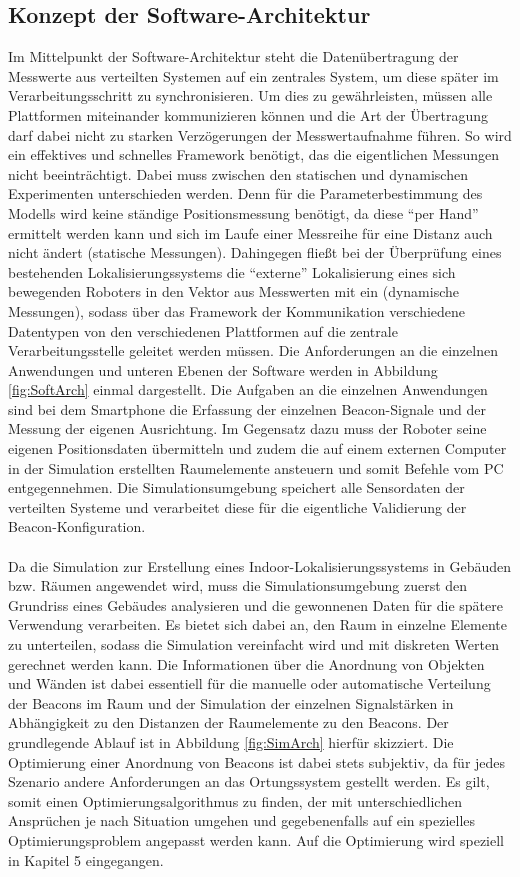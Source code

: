 \subsection{Konzept der Software-Architektur}\label{sec:KonSofArch}
Im Mittelpunkt der Software-Architektur steht die Datenübertragung der Messwerte aus verteilten Systemen auf ein zentrales System, um diese später im Verarbeitungsschritt zu synchronisieren. Um dies zu gewährleisten, müssen alle Plattformen miteinander kommunizieren können und die Art der Übertragung darf dabei nicht zu starken Verzögerungen der Messwertaufnahme führen. So wird ein effektives und schnelles Framework benötigt, das die eigentlichen Messungen nicht beeinträchtigt. Dabei muss zwischen den statischen und dynamischen Experimenten unterschieden werden. Denn für die Parameterbestimmung des Modells wird keine ständige Positionsmessung benötigt, da diese "`per Hand"' ermittelt werden kann und sich im Laufe einer Messreihe für eine Distanz auch nicht ändert (statische Messungen). Dahingegen fließt bei der Überprüfung eines bestehenden Lokalisierungssystems die "`externe"' Lokalisierung eines sich bewegenden Roboters in den Vektor aus Messwerten mit ein (dynamische Messungen), sodass über das Framework der Kommunikation verschiedene Datentypen von den verschiedenen Plattformen auf die zentrale Verarbeitungsstelle geleitet werden müssen. Die Anforderungen an die einzelnen Anwendungen und unteren Ebenen der Software werden in Abbildung \ref{fig:SoftArch} einmal dargestellt. Die Aufgaben an die einzelnen Anwendungen sind bei dem Smartphone die Erfassung der einzelnen Beacon-Signale und der Messung der eigenen Ausrichtung. Im Gegensatz dazu muss der Roboter seine eigenen Positionsdaten übermitteln und zudem die auf einem externen Computer in der Simulation erstellten Raumelemente ansteuern und somit Befehle vom PC entgegennehmen. Die Simulationsumgebung speichert alle Sensordaten der verteilten Systeme und verarbeitet diese für die eigentliche Validierung der Beacon-Konfiguration. \\ \\
Da die Simulation zur Erstellung eines Indoor-Lokalisierungssystems in Gebäuden bzw. Räumen angewendet wird, muss die Simulationsumgebung zuerst den Grundriss eines Gebäudes analysieren und die gewonnenen Daten für die spätere Verwendung verarbeiten. Es bietet sich dabei an, den Raum in einzelne Elemente zu unterteilen, sodass die Simulation vereinfacht wird und mit diskreten Werten gerechnet werden kann. Die Informationen über die Anordnung von Objekten und Wänden ist dabei essentiell für die manuelle oder automatische Verteilung der Beacons im Raum und der Simulation der einzelnen Signalstärken in Abhängigkeit zu den Distanzen der Raumelemente zu den Beacons. Der grundlegende Ablauf ist in Abbildung \ref{fig:SimArch} hierfür skizziert. Die Optimierung einer Anordnung von Beacons ist dabei stets subjektiv, da für jedes Szenario andere Anforderungen an das Ortungssystem gestellt werden. Es gilt, somit einen Optimierungsalgorithmus zu finden, der mit unterschiedlichen Ansprüchen je nach Situation umgehen und gegebenenfalls auf ein spezielles Optimierungsproblem angepasst werden kann. Auf die Optimierung wird speziell in Kapitel 5 eingegangen.
